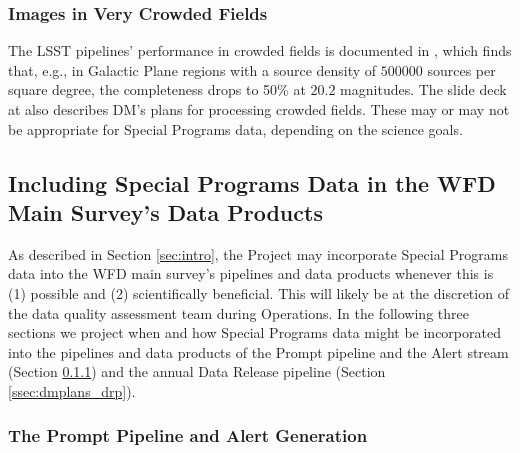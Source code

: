 \documentclass[DM,lsstdoc,toc]{lsstdoc}
\begin{document}

\subsubsection{Images in Very Crowded Fields}

The LSST pipelines' performance in crowded fields is documented in , which finds that, e.g., in Galactic Plane regions with a source density of $500000$ sources per square degree, the completeness drops to 50\% at $20.2$ magnitudes. The slide deck at  also describes DM's plans for processing crowded fields. These may or may not be appropriate for Special Programs data, depending on the science goals.


\subsection{Including Special Programs Data in the WFD Main Survey's Data Products}\label{ssec:dmplans_WFD}

As described in Section \ref{sec:intro}, the Project may incorporate Special Programs data into the WFD main survey's pipelines and data products whenever this is (1) possible and (2) scientifically beneficial. This will likely be at the discretion of the data quality assessment team during Operations. In the following three sections we project when and how Special Programs data might be incorporated into the pipelines and data products of the Prompt pipeline and the Alert stream (Section \ref{ssec:dmplans_prompt}) and the annual Data Release pipeline (Section \ref{ssec:dmplans_drp}).

\subsubsection{The Prompt Pipeline and Alert Generation}\label{ssec:dmplans_prompt}
\end{document}

